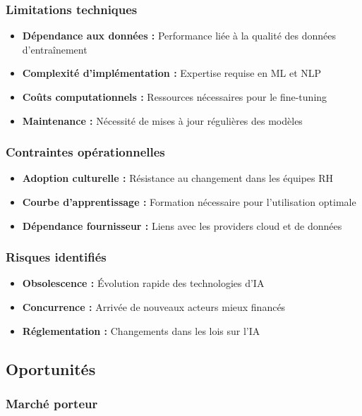 \documentclass[12pt,a4paper]{report}
\begin{document}
\subsubsection{Limitations techniques}

\begin{itemize}
\item \textbf{Dépendance aux données :} Performance liée à la qualité des données d'entraînement
\item \textbf{Complexité d'implémentation :} Expertise requise en ML et NLP
\item \textbf{Coûts computationnels :} Ressources nécessaires pour le fine-tuning
\item \textbf{Maintenance :} Nécessité de mises à jour régulières des modèles
\end{itemize}

\subsubsection{Contraintes opérationnelles}

\begin{itemize}
\item \textbf{Adoption culturelle :} Résistance au changement dans les équipes RH
\item \textbf{Courbe d'apprentissage :} Formation nécessaire pour l'utilisation optimale
\item \textbf{Dépendance fournisseur :} Liens avec les providers cloud et de données
\end{itemize}

\subsubsection{Risques identifiés}

\begin{itemize}
\item \textbf{Obsolescence :} Évolution rapide des technologies d'IA
\item \textbf{Concurrence :} Arrivée de nouveaux acteurs mieux financés
\item \textbf{Réglementation :} Changements dans les lois sur l'IA
\end{itemize}

\subsection{Oportunités}

\subsubsection{Marché porteur}
\end{document}
